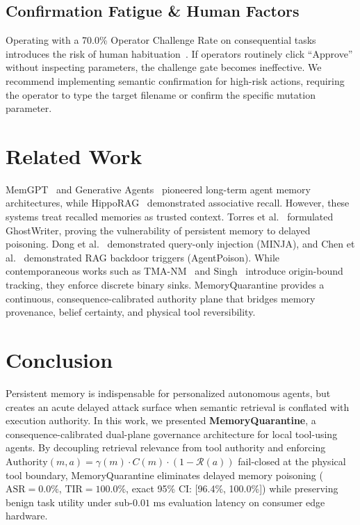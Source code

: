 \documentclass[conference]{IEEEtran}
\begin{document}
\subsection{Confirmation Fatigue \& Human Factors}
Operating with a 70.0\% Operator Challenge Rate on consequential tasks introduces the risk of human habituation~\cite{parasuraman1997humans}. If operators routinely click ``Approve'' without inspecting parameters, the challenge gate becomes ineffective. We recommend implementing semantic confirmation for high-risk actions, requiring the operator to type the target filename or confirm the specific mutation parameter.

\section{Related Work}
MemGPT~\cite{packer2023memgpt} and Generative Agents~\cite{park2023generative} pioneered long-term agent memory architectures, while HippoRAG~\cite{gutierrez2024hipporag} demonstrated associative recall. However, these systems treat recalled memories as trusted context. Torres et al.~\cite{torres2026ghostwriter} formulated GhostWriter, proving the vulnerability of persistent memory to delayed poisoning. Dong et al.~\cite{dong2024minja} demonstrated query-only injection (MINJA), and Chen et al.~\cite{chen2024agentpoison} demonstrated RAG backdoor triggers (AgentPoison). While contemporaneous works such as TMA-NM~\cite{louck2026tmanm} and Singh~\cite{singh2026provenance} introduce origin-bound tracking, they enforce discrete binary sinks. MemoryQuarantine provides a continuous, consequence-calibrated authority plane that bridges memory provenance, belief certainty, and physical tool reversibility.

\section{Conclusion}
Persistent memory is indispensable for personalized autonomous agents, but creates an acute delayed attack surface when semantic retrieval is conflated with execution authority. In this work, we presented \textbf{MemoryQuarantine}, a consequence-calibrated dual-plane governance architecture for local tool-using agents. By decoupling retrieval relevance from tool authority and enforcing $\text{Authority}(m, a) = \gamma(m) \cdot C(m) \cdot (1 - \mathcal{R}(a))$ fail-closed at the physical tool boundary, MemoryQuarantine eliminates delayed memory poisoning ($\text{ASR} = 0.0\%$, $\text{TIR} = 100.0\%$, exact 95\% CI: [96.4\%, 100.0\%]) while preserving benign task utility under sub-$0.01\text{ ms}$ evaluation latency on consumer edge hardware.



\end{document}
